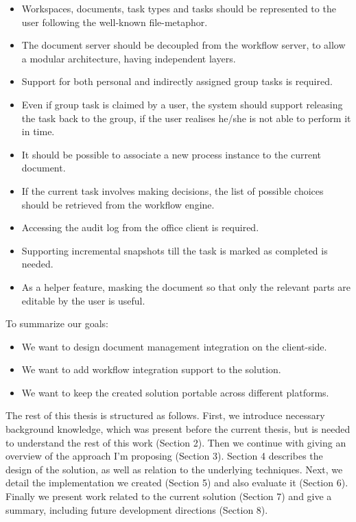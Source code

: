 \begin{itemize}
\item Workspaces, documents, task types and tasks should be represented to the
user following the well-known file-metaphor.
\item The document server should be decoupled from the workflow server, to
allow a modular architecture, having independent layers.
\item Support for both personal and indirectly assigned group tasks is required.
\item Even if group task is claimed by a user, the system should support
releasing the task back to the group, if the user realises he/she is not able to
perform it in time.
\item It should be possible to associate a new process instance to the current
document.
\item If the current task involves making decisions, the list of possible
choices should be retrieved from the workflow engine.
\item Accessing the audit log from the office client is required.
\item Supporting incremental snapshots till the task is marked as completed is
needed.
\item As a helper feature, masking the document so that only the relevant parts
are editable by the user is useful.
\end{itemize}

To summarize our goals:

\begin{itemize}
\item We want to design document management integration on the client-side.
\item We want to add workflow integration support to the solution.
\item We want to keep the created solution portable across different platforms.
\end{itemize}

The rest of this thesis is structured as follows. First, we introduce necessary
background knowledge, which was present before the current thesis, but is
needed to understand the rest of this work (Section 2). Then we continue with
giving an overview of the approach I'm proposing (Section 3). Section 4
describes the design of the solution, as well as relation to the underlying
techniques. Next, we detail the implementation we created (Section 5) and also
evaluate it (Section 6). Finally we present work related to the current
solution (Section 7) and give a summary, including future development
directions (Section 8).
